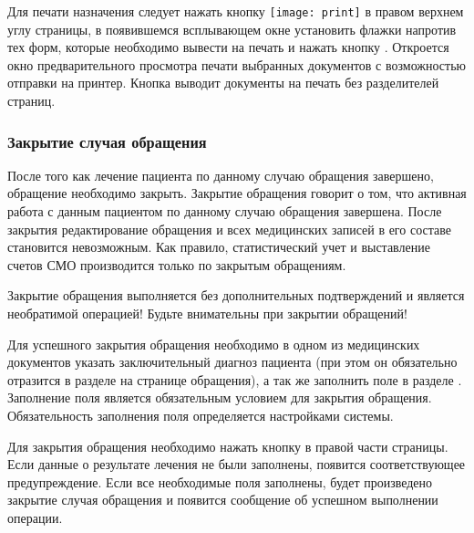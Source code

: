 {{Для печати назначения следует нажать кнопку \texttt{[image: print]} в правом верхнем углу страницы, в появившемся всплывающем окне установить флажки напротив тех форм, которые необходимо вывести на печать и нажать кнопку . Откроется окно предварительного просмотра печати выбранных документов с возможностью отправки на принтер. Кнопка  выводит документы на печать без разделителей страниц.
}{}

\subsubsection{Закрытие случая обращения}

После того как лечение пациента по данному случаю обращения завершено, обращение необходимо закрыть. Закрытие обращения говорит о том, что активная работа с данным пациентом по данному случаю обращения завершена. После закрытия редактирование обращения и всех медицинских записей в его составе становится невозможным. Как правило, статистический учет и выставление счетов СМО производится только по закрытым обращениям.

\begin{vnim}
 Закрытие обращения выполняется без дополнительных подтверждений и является необратимой операцией! Будьте внимательны при закрытии обращений!
\end{vnim} 
 
Для успешного закрытия обращения необходимо в одном из медицинских документов указать заключительный диагноз пациента (при этом он обязательно отразится в разделе  на странице обращения), а так же заполнить поле  в разделе . Заполнение поля  является обязательным условием для закрытия обращения. Обязательность заполнения поля  определяется настройками системы.

Для закрытия обращения необходимо нажать кнопку  в правой части страницы. Если данные о результате лечения не были заполнены, появится соответствующее предупреждение. Если все необходимые поля заполнены, будет произведено закрытие случая обращения и появится сообщение об успешном выполнении операции.


}{}

